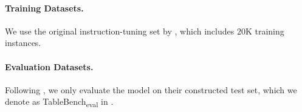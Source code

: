\documentclass[11pt]{article}
\begin{document}


\paragraph{Training Datasets.}
We use the original instruction-tuning set by \citet{wu2025tablebench}, which includes 20K training instances.

\paragraph{Evaluation Datasets.}
Following \citet{wu2025tablebench}, we only evaluate the model on their constructed test set, which we denote as TableBench\textsubscript{eval} in .
\end{document}
